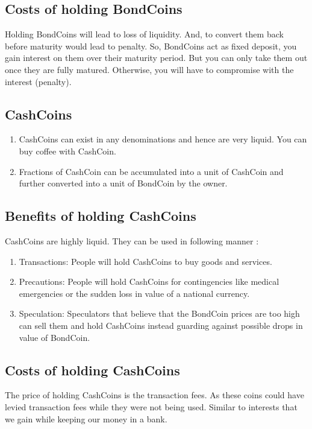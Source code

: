 \subsection{Costs of holding BondCoins}

Holding BondCoins will lead to loss of liquidity. And, to convert them back before maturity would lead to penalty. So, BondCoins act as fixed deposit, you gain interest on them over their maturity period. But you can only take them out once they are fully matured. Otherwise, you will have to compromise with the interest (penalty).

\subsection{CashCoins}

\begin{enumerate}
    \item CashCoins can exist in any denominations and hence are very liquid. You can buy coffee with CashCoin.
    \item Fractions of CashCoin can be accumulated into a unit of CashCoin and further converted into a unit of BondCoin by the owner.
\end{enumerate}

\subsection{Benefits of holding CashCoins}

CashCoins are highly liquid. They can be used in following manner :

\begin{enumerate}
    \item Transactions: People will hold CashCoins to buy goods and services.
    \item Precautions: People will hold CashCoins for contingencies like medical emergencies or the sudden loss in value of a national currency.
    \item Speculation: Speculators that believe that the BondCoin prices are too high can sell them and hold CashCoins instead guarding against possible drops in value of BondCoin.
\end{enumerate}

\subsection{Costs of holding CashCoins}

The price of holding CashCoins is the transaction fees. As these coins could have levied transaction fees while they were not being used. Similar to interests that we gain while keeping our money in a bank.

